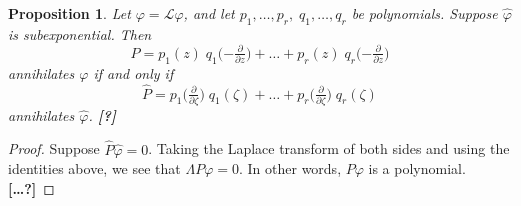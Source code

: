 \documentclass{article}
\theoremstyle{definition}
\theoremstyle{plain}
\newtheorem{prop}{Proposition}
\newcommand{\laplace}{\mathcal{L}}
\begin{document}
\begin{prop}
Let $\varphi = \laplace \hat{\varphi}$, and let $p_1, \ldots, p_r,\;q_1, \ldots, q_r$ be polynomials. Suppose $\hat{\varphi}$ is subexponential. Then
\[ P = p_1(z)\;q_1\big({-\tfrac{\partial}{\partial z}}\big) + \ldots + p_r(z)\;q_r\big({-\tfrac{\partial}{\partial z}}\big) \]
annihilates $\varphi$ if and only if
\[ \hat{P} = p_1\big(\tfrac{\partial}{\partial \zeta}\big)\;q_1(\zeta) + \ldots + p_r\big(\tfrac{\partial}{\partial \zeta})\;q_r(\zeta) \]
annihilates $\hat{\varphi}$. \textbf{[?]}
\end{prop}
\begin{proof}
Suppose $\hat{P} \hat{\varphi} = 0$. Taking the Laplace transform of both sides and using the identities above, we see that $\Lambda P \varphi = 0$. In other words, $P \varphi$ is a polynomial. \textbf{[\ldots?]}
\end{proof}
\end{document}
